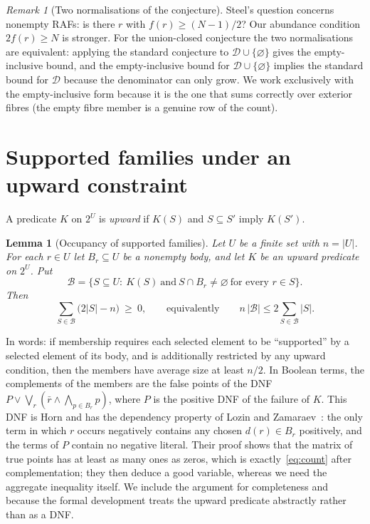 \documentclass[11pt,a4paper]{article}
\theoremstyle{plain}
\newtheorem{lemma}[theorem]{Lemma}
\theoremstyle{definition}
\theoremstyle{remark}
\newtheorem{remark}[theorem]{Remark}
\newcommand{\DD}{\mathcal D}
\newcommand{\BB}{\mathcal B}
\begin{document}
\begin{remark}[Two normalisations of the conjecture]\label{rem:normal}
Steel's question concerns nonempty RAFs: is there $r$ with $f(r)\ge (N-1)/2$? Our
abundance condition $2f(r)\ge N$ is stronger. For the union-closed conjecture the two
normalisations are equivalent: applying the standard conjecture to $\DD\cup\{\varnothing\}$
gives the empty-inclusive bound, and the empty-inclusive bound for $\DD\cup\{\varnothing\}$
implies the standard bound for $\DD$ because the denominator can only grow. We work
exclusively with the empty-inclusive form because it is the one that sums correctly over
exterior fibres (the empty fibre member is a genuine row of the count).
\end{remark}

\section{Supported families under an upward constraint}\label{sec:count}

A predicate $K$ on $2^U$ is \emph{upward} if $K(S)$ and $S\subseteq S'$ imply $K(S')$.

\begin{lemma}[Occupancy of supported families]\label{lem:count}
Let $U$ be a finite set with $n=|U|$. For each $r\in U$ let $B_r\subseteq U$ be a nonempty
\emph{body}, and let $K$ be an upward predicate on $2^U$. Put
\[
\BB=\{S\subseteq U:\ K(S)\ \text{and}\ S\cap B_r\ne\varnothing\ \text{for every } r\in S\}.
\]
Then
\begin{equation}\label{eq:count}
\sum_{S\in\BB}\bigl(2|S|-n\bigr)\ \ge\ 0,
\qquad\text{equivalently}\qquad n\,|\BB|\le 2\sum_{S\in\BB}|S|.
\end{equation}
\end{lemma}

In words: if membership requires each selected element to be ``supported'' by a selected
element of its body, and is additionally restricted by any upward condition, then the
members have average size at least $n/2$. In Boolean terms, the complements of the members
are the false points of the DNF $P\vee\bigvee_r(\bar r\wedge\bigwedge_{p\in B_r}p)$, where
$P$ is the positive DNF of the failure of $K$. This DNF is Horn and has the dependency
property of Lozin and Zamaraev~\cite[Theorem~4]{lozin2024union}: the only term in which
$r$ occurs negatively contains any chosen $d(r)\in B_r$ positively, and the terms of $P$
contain no negative literal. Their proof shows that the matrix of true points has at least
as many ones as zeros, which is exactly~\eqref{eq:count} after complementation; they then
deduce a good variable, whereas we need the aggregate inequality itself. We include the
argument for completeness and because the formal development treats the upward predicate
abstractly rather than as a DNF.
\end{document}
